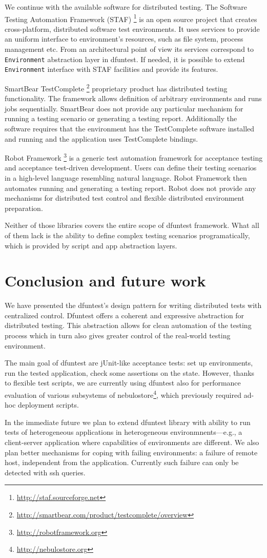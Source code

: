 We continue with the available software for distributed testing.
The Software Testing Automation Framework (STAF) \footnote{\url{http://staf.sourceforge.net}} is an open source
project that creates cross-platform, distributed software test environments. It
uses services to provide an uniform interface to environment's resources, such
as file system, process management etc. From an architectural point of view its
services correspond to \texttt{Environment} abstraction layer in dfuntest.
If needed, it is possible to extend \texttt{Environment} interface with STAF facilities and provide its features.

SmartBear TestComplete \footnote{\url{http://smartbear.com/product/testcomplete/overview}} proprietary product has distributed testing functionality.
The framework allows definition of arbitrary environments and runs jobs sequentially.
SmartBear does not provide any particular mechanism for running a testing scenario or generating a testing report.
Additionally the software requires that the environment has the TestComplete software installed and running and the application uses TestComplete bindings.

Robot Framework \footnote{\url{http://robotframework.org}} is a generic test automation framework for acceptance testing and acceptance test-driven development.
Users can define their testing scenarios in a high-level language resembling natural language.
Robot Framework then automates running and generating a testing report.
Robot does not provide any mechanisms for distributed test control and flexible distributed environment preparation.

Neither of those libraries covers the entire scope of dfuntest framework. What
all of them lack is the ability to define complex testing scenarios
programatically, which is provided by script and app abstraction layers.

\section{Conclusion and future work}

We have presented the dfuntest's design pattern for writing distributed tests with centralized control.
Dfuntest offers a coherent and expressive abstraction for distributed testing.
This abstraction allows for clean automation of the testing process which in turn also gives greater control of the real-world testing environment.

The main goal of dfuntest are jUnit-like acceptance tests: set up environments,
run the tested application, check some assertions on the state. However, thanks
to flexible test scripts, we are currently using dfuntest also for performance
evaluation of various subsystems of
nebulostore\footnote{\url{http://nebulostore.org}}, which previously required ad-hoc deployment scripts.

In the immediate future we plan to extend dfuntest library with ability to run tests of heterogeneous applications in heterogeneous environmnents---e.g., a client-server application where capabilities of environments are different.
We also plan better mechanisms for coping with failing environments: a failure of remote host, independent from the application. Currently such failure can only be detected with ssh queries.
